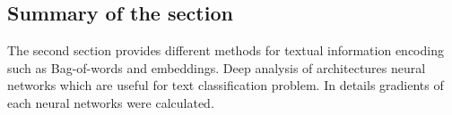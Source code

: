 \subsection{Summary of the section}



The second section provides different methods for textual information encoding such as Bag-of-words and embeddings. Deep analysis of architectures neural networks which are useful for text classification problem. In details gradients of each neural networks were calculated.   